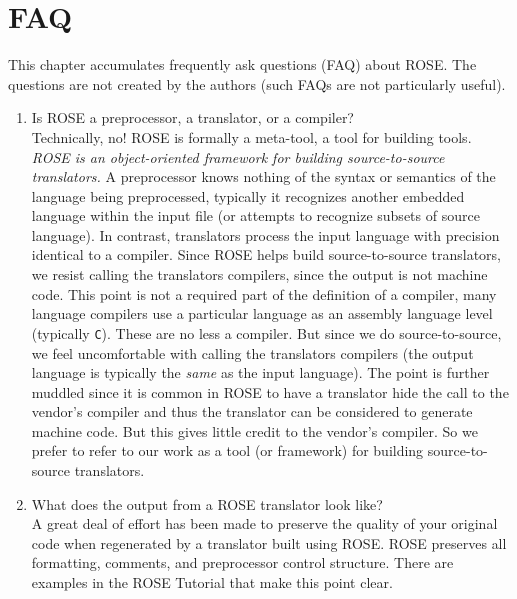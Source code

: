 \chapter{ FAQ }

\label{faq:introduction}

This chapter accumulates frequently ask questions (FAQ) about ROSE. The questions are not
created by the authors (such FAQs are not particularly useful).

\begin{enumerate}

\item Is ROSE a preprocessor, a translator, or a compiler? \\
   Technically, no! ROSE is formally a meta-tool, a tool for building tools.
{\em ROSE is an object-oriented framework for building source-to-source translators.}
A preprocessor knows nothing of the syntax or semantics of the
language being preprocessed, typically it recognizes another embedded language
within the input file (or attempts to recognize subsets of source language).  In 
contrast, translators process the input language with precision identical to a
compiler.  Since ROSE helps build source-to-source translators, we resist calling
the translators compilers, since the output is not machine code.  This point is
not a required part of the definition of a compiler, many language compilers use
a particular language as an assembly language level (typically {\tt C}).  These
are no less a compiler.  But since we do source-to-source, we feel uncomfortable with
calling the translators compilers (the output language is typically the {\em same} 
as the input language).  The point is further muddled since it is
common in ROSE to have a translator hide the call to the vendor's compiler and thus
the translator can be considered to generate machine code. But this gives little
credit to the vendor's compiler.  So we prefer to refer to our work as a tool 
(or framework) for building source-to-source translators.

\item What does the output from a ROSE translator look like? \\
   A great deal of effort has been made to preserve the quality of your 
original code when regenerated by a translator built using ROSE.
ROSE preserves all formatting, comments, and preprocessor control 
structure.  There are examples in the ROSE Tutorial that make this point clear.


\end{enumerate}
